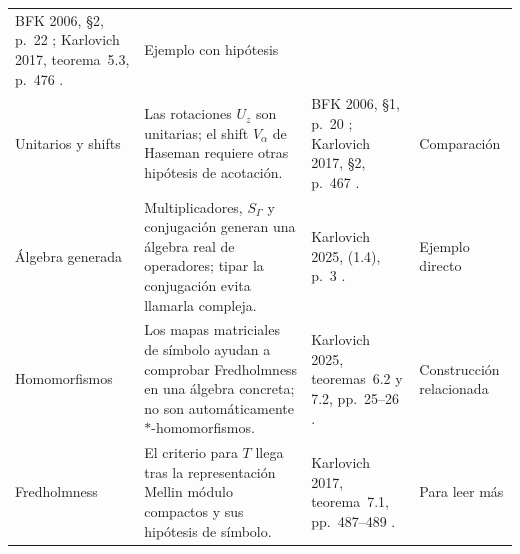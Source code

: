 \begin{longtable}{>{\raggedright\arraybackslash}p{2.5cm}>{\raggedright\arraybackslash}p{5.5cm}>{\raggedright\arraybackslash}p{3.6cm}>{\raggedright\arraybackslash}p{2.0cm}}
BFK 2006, §2, p.~22 \cite{BFK2006}; Karlovich 2017, teorema~5.3, p.~476 \cite{Karlovich2017}. &
Ejemplo con hipótesis\\
Unitarios y shifts &
Las rotaciones $U_z$ son unitarias; el shift $V_\alpha$ de Haseman
requiere otras hipótesis de acotación. &
BFK 2006, §1, p.~20 \cite{BFK2006}; Karlovich 2017, §2, p.~467 \cite{Karlovich2017}. &
Comparación\\
Álgebra generada &
Multiplicadores, $S_\Gamma$ y conjugación generan una álgebra real
de operadores; tipar la conjugación evita llamarla compleja. &
Karlovich 2025, (1.4), p.~3 \cite{Karlovich2025}. &
Ejemplo directo\\
Homomorfismos &
Los mapas matriciales de símbolo ayudan a comprobar Fredholmness
en una álgebra concreta; no son automáticamente $*$-homomorfismos. &
Karlovich 2025, teoremas~6.2 y 7.2, pp.~25--26 \cite{Karlovich2025}. &
Construcción relacionada\\
Fredholmness &
El criterio para $T$ llega tras la representación Mellin módulo
compactos y sus hipótesis de símbolo. &
Karlovich 2017, teorema~7.1, pp.~487--489 \cite{Karlovich2017}. &
Para leer más\\
\bottomrule
\end{longtable}
\normalsize
